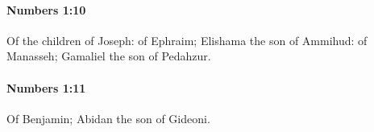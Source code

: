 		\paragraph{Numbers 1:10} %
			\label{NUMBERS-1-10}

			Of the children of Joseph: of Ephraim; Elishama the son of Ammihud: of Manasseh; Gamaliel the son of Pedahzur.


		\paragraph{Numbers 1:11} %
			\label{NUMBERS-1-11}

			Of Benjamin; Abidan the son of Gideoni.


